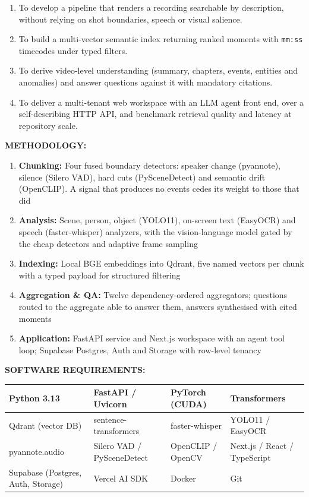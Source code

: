 \documentclass[12pt]{article}
\newcommand{\reportlabel}[1]{\vspace{0.6em}\textbf{\MakeUppercase{#1}}\par\vspace{0.3em}}
\begin{document}
\begin{enumerate}[noitemsep, topsep=0pt, leftmargin=1.5em]
    \item To develop a pipeline that renders a recording searchable by description, without relying on shot boundaries, speech or visual salience.
    \item To build a multi-vector semantic index returning ranked moments with \texttt{mm:ss} timecodes under typed filters.
    \item To derive video-level understanding (summary, chapters, events, entities and anomalies) and answer questions against it with mandatory citations.
    \item To deliver a multi-tenant web workspace with an LLM agent front end, over a self-describing HTTP API, and benchmark retrieval quality and latency at repository scale.
\end{enumerate}

\reportlabel{Methodology:}

\begin{enumerate}[noitemsep, topsep=0pt, leftmargin=1.5em]
    \item \textbf{Chunking:} Four fused boundary detectors: speaker change (pyannote), silence (Silero VAD), hard cuts (PySceneDetect) and semantic drift (OpenCLIP). A signal that produces no events cedes its weight to those that did
    \item \textbf{Analysis:} Scene, person, object (YOLO11), on-screen text (EasyOCR) and speech (faster-whisper) analyzers, with the vision-language model gated by the cheap detectors and adaptive frame sampling
    \item \textbf{Indexing:} Local BGE embeddings into Qdrant, five named vectors per chunk with a typed payload for structured filtering
    \item \textbf{Aggregation \& QA:} Twelve dependency-ordered aggregators; questions routed to the aggregate able to answer them, answers synthesised with cited moments
    \item \textbf{Application:} FastAPI service and Next.js workspace with an agent tool loop; Supabase Postgres, Auth and Storage with row-level tenancy
\end{enumerate}

\reportlabel{Software Requirements:}

\small
\begin{tabular}{|p{}|p{}|p{}|p{}|}
\hline
Python 3.13 & FastAPI / Uvicorn & PyTorch (CUDA) & Transformers \\\hline
Qdrant (vector DB) & sentence-transformers & faster-whisper & YOLO11 / EasyOCR \\\hline
pyannote.audio & Silero VAD / PySceneDetect & OpenCLIP / OpenCV & Next.js / React / TypeScript \\\hline
Supabase (Postgres, Auth, Storage) & Vercel AI SDK & Docker & Git \\\hline
\end{tabular}
\normalsize
\end{document}
